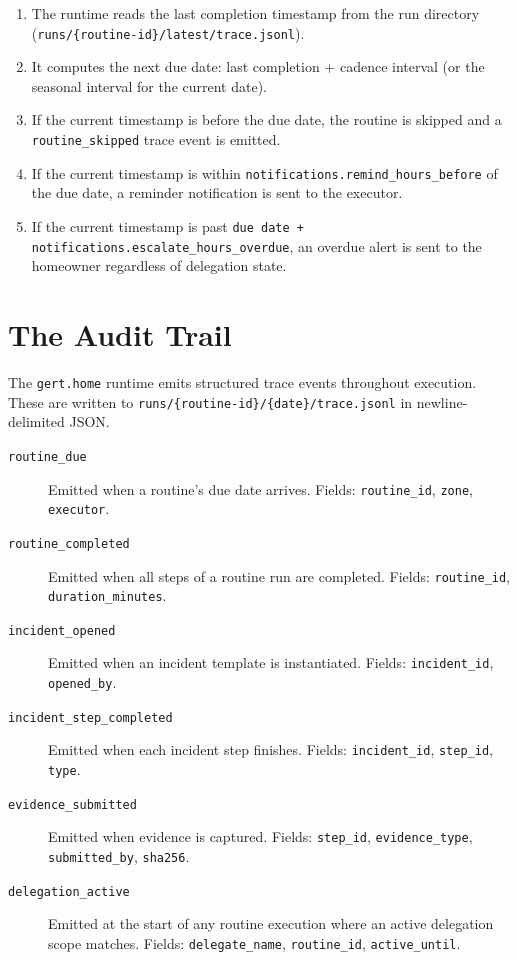 \begin{enumerate}
  \item The runtime reads the last completion timestamp from the run directory
        (\texttt{runs/\{routine-id\}/latest/trace.jsonl}).
  \item It computes the next due date: last completion + cadence interval (or the seasonal
        interval for the current date).
  \item If the current timestamp is before the due date, the routine is skipped and a
        \texttt{routine\_skipped} trace event is emitted.
  \item If the current timestamp is within \texttt{notifications.remind\_hours\_before} of
        the due date, a reminder notification is sent to the executor.
  \item If the current timestamp is past \texttt{due date + notifications.escalate\_hours\_overdue},
        an overdue alert is sent to the homeowner regardless of delegation state.
\end{enumerate}

\section{The Audit Trail}
\label{sec:integration-audit-trail}

The \texttt{gert.home} runtime emits structured trace events throughout execution. These are
written to \texttt{runs/\{routine-id\}/\{date\}/trace.jsonl} in newline-delimited JSON.

\begin{description}
  \item[\texttt{routine\_due}] Emitted when a routine's due date arrives. Fields:
        \texttt{routine\_id}, \texttt{zone}, \texttt{executor}.
  \item[\texttt{routine\_completed}] Emitted when all steps of a routine run are completed.
        Fields: \texttt{routine\_id}, \texttt{duration\_minutes}.
  \item[\texttt{incident\_opened}] Emitted when an incident template is instantiated.
        Fields: \texttt{incident\_id}, \texttt{opened\_by}.
  \item[\texttt{incident\_step\_completed}] Emitted when each incident step finishes.
        Fields: \texttt{incident\_id}, \texttt{step\_id}, \texttt{type}.
  \item[\texttt{evidence\_submitted}] Emitted when evidence is captured. Fields:
        \texttt{step\_id}, \texttt{evidence\_type}, \texttt{submitted\_by}, \texttt{sha256}.
  \item[\texttt{delegation\_active}] Emitted at the start of any routine execution where
        an active delegation scope matches. Fields: \texttt{delegate\_name},
        \texttt{routine\_id}, \texttt{active\_until}.
\end{description}

